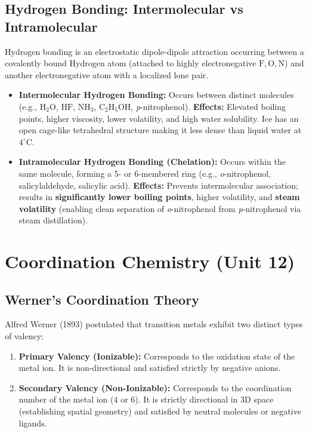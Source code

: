 \documentclass[10pt,a4paper]{article}
\begin{document}
\subsection{Hydrogen Bonding: Intermolecular vs Intramolecular}
Hydrogen bonding is an electrostatic dipole-dipole attraction occurring between a covalently bound Hydrogen atom (attached to highly electronegative $\mathrm{F, O, N}$) and another electronegative atom with a localized lone pair.
\begin{itemize}
  \item \textbf{Intermolecular Hydrogen Bonding:} Occurs between distinct molecules (e.g., $\mathrm{H_2O}$, $\mathrm{HF}$, $\mathrm{NH_3}$, $\mathrm{C_2H_5OH}$, \textit{p}-nitrophenol).
  \textbf{Effects:} Elevated boiling points, higher viscosity, lower volatility, and high water solubility. Ice has an open cage-like tetrahedral structure making it less dense than liquid water at $4^\circ\text{C}$.
  \item \textbf{Intramolecular Hydrogen Bonding (Chelation):} Occurs within the same molecule, forming a 5- or 6-membered ring (e.g., \textit{o}-nitrophenol, salicylaldehyde, salicylic acid).
  \textbf{Effects:} Prevents intermolecular association; results in \textbf{significantly lower boiling points}, higher volatility, and \textbf{steam volatility} (enabling clean separation of \textit{o}-nitrophenol from \textit{p}-nitrophenol via steam distillation).
\end{itemize}

\section{Coordination Chemistry (Unit 12)}

\subsection{Werner's Coordination Theory}
Alfred Werner (1893) postulated that transition metals exhibit two distinct types of valency:
\begin{enumerate}
  \item \textbf{Primary Valency (Ionizable):} Corresponds to the oxidation state of the metal ion. It is non-directional and satisfied strictly by negative anions.
  \item \textbf{Secondary Valency (Non-Ionizable):} Corresponds to the coordination number of the metal ion ($4$ or $6$). It is strictly directional in 3D space (establishing spatial geometry) and satisfied by neutral molecules or negative ligands.
\end{enumerate}
\end{document}

